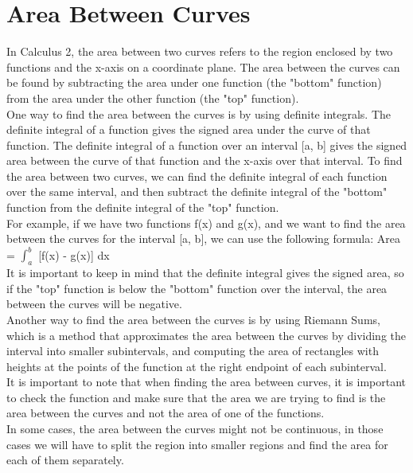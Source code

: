 \section{Area Between Curves}
In Calculus 2, the area between two curves refers to the region enclosed by two 
functions and the x-axis on a coordinate plane. The area between the curves can 
be found by subtracting the area under one function (the "bottom" function) from 
the area under the other function (the "top" function).\\

One way to find the area between the curves is by using definite integrals. The 
definite integral of a function gives the signed area under the curve of that 
function. The definite integral of a function over an interval [a, b] gives the 
signed area between the curve of that function and the x-axis over that 
interval. To find the area between two curves, we can find the definite integral 
of each function over the same interval, and then subtract the definite integral 
of the "bottom" function from the definite integral of the "top" function.\\

For example, if we have two functions f(x) and g(x), and we want to find the 
area between the curves for the interval [a, b], we can use the following 
formula: Area = $\int_{a}^{b}$ [f(x) - g(x)] dx\\

It is important to keep in mind that the definite integral gives the signed 
area, so if the "top" function is below the "bottom" function over the interval, 
the area between the curves will be negative.\\

Another way to find the area between the curves is by using Riemann Sums, which 
is a method that approximates the area between the curves by dividing the 
interval into smaller subintervals, and computing the area of rectangles with 
heights at the points of the function at the right endpoint of each 
subinterval.\\

It is important to note that when finding the area between curves, it is 
important to check the function and make sure that the area we are trying to 
find is the area between the curves and not the area of one of the functions.\\

In some cases, the area between the curves might not be continuous, in those 
cases we will have to split the region into smaller regions and find the area 
for each of them separately.\\

